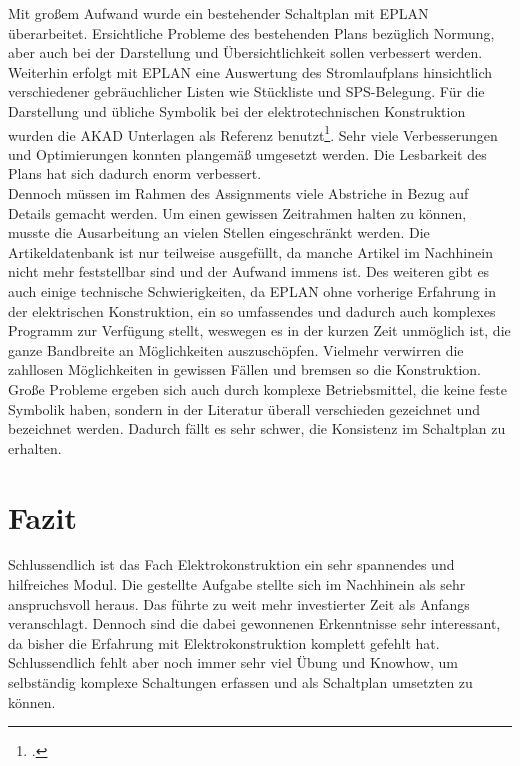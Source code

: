 \documentclass[12pt,a4paper]{scrartcl}	%
\begin{document}
Mit großem Aufwand wurde ein bestehender Schaltplan mit EPLAN überarbeitet. Ersichtliche Probleme des bestehenden Plans bezüglich Normung, aber auch bei der Darstellung und Übersichtlichkeit sollen verbessert werden. Weiterhin erfolgt mit EPLAN eine Auswertung des Stromlaufplans hinsichtlich verschiedener gebräuchlicher Listen wie Stückliste und SPS-Belegung. Für die Darstellung und übliche Symbolik bei der elektrotechnischen Konstruktion wurden die AKAD Unterlagen als  Referenz benutzt\footcite[vgl.]{CAD}.
Sehr viele Verbesserungen und Optimierungen konnten plangemäß umgesetzt werden. Die Lesbarkeit des Plans hat sich dadurch enorm verbessert.\\
Dennoch müssen im Rahmen des Assignments viele Abstriche in Bezug auf Details gemacht werden. Um einen gewissen Zeitrahmen halten zu können, musste die Ausarbeitung an vielen Stellen eingeschränkt werden. Die Artikeldatenbank ist nur teilweise ausgefüllt, da manche Artikel im Nachhinein nicht mehr feststellbar sind und der Aufwand immens ist. Des weiteren gibt es auch einige technische Schwierigkeiten, da EPLAN ohne vorherige Erfahrung in der elektrischen Konstruktion, ein so umfassendes und dadurch auch komplexes Programm zur Verfügung stellt, weswegen es in der kurzen Zeit unmöglich ist, die ganze Bandbreite an Möglichkeiten auszuschöpfen. Vielmehr verwirren die zahllosen Möglichkeiten in gewissen Fällen und bremsen so die Konstruktion.\\
Große Probleme ergeben sich auch durch komplexe Betriebsmittel, die keine feste Symbolik haben, sondern in der Literatur überall verschieden gezeichnet und bezeichnet werden. Dadurch fällt es sehr schwer, die Konsistenz im Schaltplan zu erhalten.


\section{Fazit}

Schlussendlich ist das Fach Elektrokonstruktion ein sehr spannendes und hilfreiches Modul. Die gestellte Aufgabe stellte sich im Nachhinein als sehr anspruchsvoll heraus. Das führte zu weit mehr investierter Zeit als Anfangs veranschlagt. Dennoch sind die dabei gewonnenen Erkenntnisse sehr interessant, da bisher die Erfahrung mit Elektrokonstruktion komplett gefehlt hat.\\
Schlussendlich fehlt aber noch immer sehr viel Übung und Knowhow, um selbständig komplexe Schaltungen erfassen und als Schaltplan umsetzten zu können.   

\newpage
\printbibliography
\end{document}
